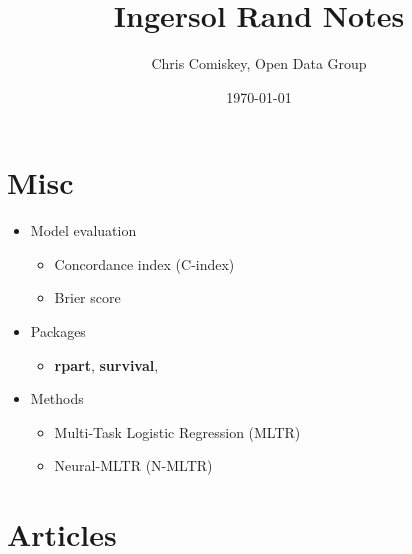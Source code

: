 \documentclass{article}
\title{Ingersol Rand Notes}
\author{Chris Comiskey, Open Data Group}
\date{\today}
\begin{document}
\maketitle{}

\section*{Misc}
\begin{itemize}
\item Model evaluation 
  \begin{itemize}
  \item Concordance index (C-index)
  \item Brier score
  \end{itemize}
\item Packages
  \begin{itemize}
  \item {\bf rpart}, {\bf survival}, 
  \end{itemize}
\item Methods
  \begin{itemize}
  \item Multi-Task Logistic Regression (MLTR) 
  \item Neural-MLTR (N-MLTR)
  \end{itemize}
\end{itemize}

\section{Articles}
\end{document}
